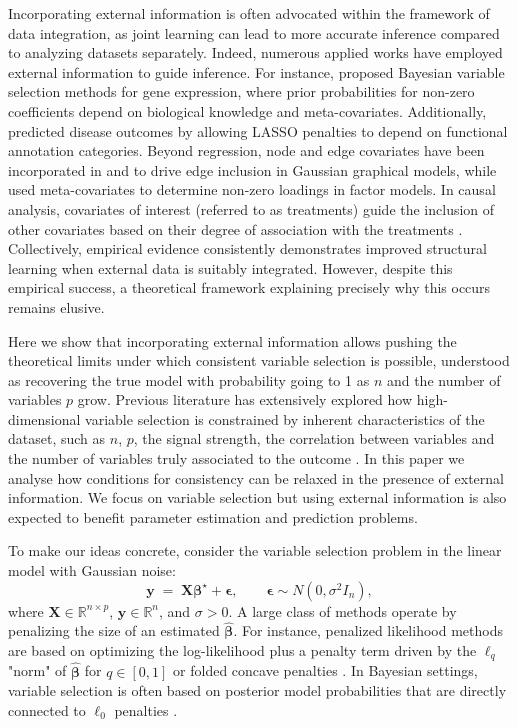 \documentclass[aos]{imsart}
\theoremstyle{plain}
\newcommand{\R}{\mathbb{R}}
\newcommand{\bs}{\boldsymbol}
\begin{document}
Incorporating external information is often advocated within the framework of data integration, as joint learning can lead to more accurate inference compared to analyzing datasets separately. Indeed, numerous applied works have employed external information to guide inference. For instance, \cite{stingo:2011, quintana, cassese:2014} proposed Bayesian variable selection methods for gene expression, where prior probabilities for non-zero coefficients depend on biological knowledge and meta-covariates. Additionally, \cite{chen_tinghuei:2021} predicted disease outcomes by allowing LASSO penalties to depend on functional annotation categories. Beyond regression, node and edge covariates have been incorporated in \cite{peterson} and \cite{jewson2023graphical} to drive edge inclusion in Gaussian graphical models, while \cite{schiavon2022generalized} used meta-covariates to determine non-zero loadings in factor models. In causal analysis, covariates of interest (referred to as treatments) guide the inclusion of other covariates based on their degree of association with the treatments \cite{belloni2014inference,antonelli2021bayesian}. Collectively, empirical evidence consistently demonstrates improved structural learning when external data is suitably integrated. However, despite this empirical success, a theoretical framework explaining precisely why this occurs remains elusive.

Here we show that incorporating external information allows pushing the theoretical limits under which consistent variable selection is possible, understood as recovering the true model with probability going to 1 as $n$ and the number of variables $p$ grow. Previous literature has extensively explored how high-dimensional variable selection is constrained by inherent characteristics of the dataset, such as $n$, $p$, the signal strength, the correlation between variables and the number of variables truly associated to the outcome \cite{buhlmannvandegeerbook,overviewvarsel,handbookbayesvarsel,wainwrighthighdimbook}. In this paper we analyse how conditions for consistency can be relaxed in the presence of external information. We focus on variable selection but using external information is also expected to benefit parameter estimation and prediction problems. 

To make our ideas concrete, consider the variable selection problem in the linear model with Gaussian noise:
\begin{equation}\label{eq:linearmodel}
	\bs y \;=\; \bs X \bs \beta^{\star} + \bs\epsilon,\qquad \bs \epsilon \sim N(0,\sigma^2 I_n),
\end{equation}
where $\bs X\in \R^{n\times p}$, $\bs y\in \R^n$, and $\sigma >0$. A large class of methods operate by penalizing the size of an estimated $\hat{\bs  \beta}$. For instance, penalized likelihood methods are based on optimizing the log-likelihood plus a penalty term driven by the $\ell_q$ "norm" of $\hat{\bs  \beta}$ for $q\in [0,1]$ or folded concave penalties \citep{lasso,overviewvarsel,bertsimas}. 
In Bayesian settings, variable selection is often based on posterior model probabilities that are directly connected to $\ell_0$ penalties \citep{BIC,EBIC,rossell2022concentration}. 
\end{document}
